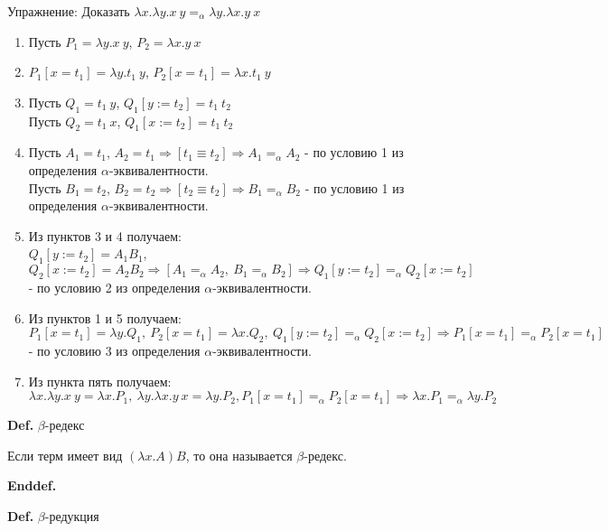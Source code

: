 \documentclass[12pt]{extreport}
\begin{document}
Упражнение: Доказать $\lambda x.\lambda y.x \ y =_\alpha \lambda y.\lambda x.y\ x$
\begin{enumerate}[leftmargin=3cm]
    \item Пусть $P_1 = \lambda y.x \ y$, $P_2 = \lambda x.y \ x$
    \item $P_1[x = t_1] = \lambda y.t_1\ y$, $P_2[x = t_1] = \lambda x.t_1\ y$
    \item Пусть $Q_1 = t_1\ y$, $Q_1[y := t_2] = t_1\ t_2$ \\
          Пусть $Q_2 = t_1\ x$, $Q_1[x := t_2] = t_1\ t_2$
    \item Пусть $A_1 = t_1$, $A_2 = t_1 \Rightarrow [t_1 \equiv t_2] \Rightarrow A_1       =_\alpha A_2$ - по условию 1 из определения $\alpha$-эквивалентности. \\
          Пусть $B_1 = t_2$, $B_2 = t_2 \Rightarrow [t_2 \equiv t_2] \Rightarrow B_1 =_\alpha B_2$ - по условию 1 из определения $\alpha$-эквивалентности.
    \item Из пунктов 3 и 4 получаем: \\ $Q_1[y := t_2] = A_1B_1$, $Q_2[x := t_2] = A_2B_2 \Rightarrow[A_1=_\alpha A_2,\ B_1=_\alpha B_2]\Rightarrow Q_1[y := t_2]  =_\alpha Q_2[x := t_2] $ - по условию 2 из определения $\alpha$-эквивалентности.
    \item Из пунктов 1 и 5 получаем: \\
        $P_1[x = t_1] = \lambda y.Q_1,\ P_2[x = t_1] = \lambda x.Q_2,\ Q_1[y := t_2]  =_\alpha Q_2[x := t_2] \Rightarrow P_1[x = t_1] =_\alpha P_2[x = t_1]$ - по условию 3 из определения $\alpha$-эквивалентности.
    \item Из пункта пять получаем: \\ 
    $\lambda x.\lambda y.x \ y = \lambda x.P_1,\ \lambda y.\lambda x.y\ x = \lambda y.P_2, P_1[x = t_1] =_\alpha P_2[x = t_1] \Rightarrow \lambda x.P_1 =_\alpha \lambda y.P_2$ 
\end{enumerate}

\noindent\textbf{Def.} $\beta$-редекс 

Если терм имеет вид $(\lambda x.A)B$, то она называется $\beta$-редекс.

\noindent\textbf{Enddef.}

\noindent\textbf{Def.} $\beta$-редукция 
\end{document}
